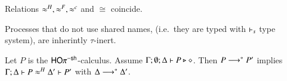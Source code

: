 \begin{theorem}[Coincidence]\rm
	\label{the:coincidence}
	Relations $\approx^H, \approx^F, \approx^{c}$ and $\cong$ coincide.
\end{theorem}


Processes that do not use shared names, (i.e.~they are typed with
$\vdash_s$ type system), are inherintly $\tau$-inert.

\begin{lemma}\rm
	\label{lem:tau_inert}
	Let $P$ is the $\mathsf{HO}\pi^{-\mathsf{sh}}$-calculus. 
Assume $\Gamma; \emptyset; \Delta \vdash P \triangleright \diamond$. Then 
$P \longrightarrow^\ast P'$ implies $\Gamma; \Delta \vdash 
P \approx^H \Delta'\vdash P'$ with $\Delta \longrightarrow^\ast \Delta'$. 
\end{lemma}



